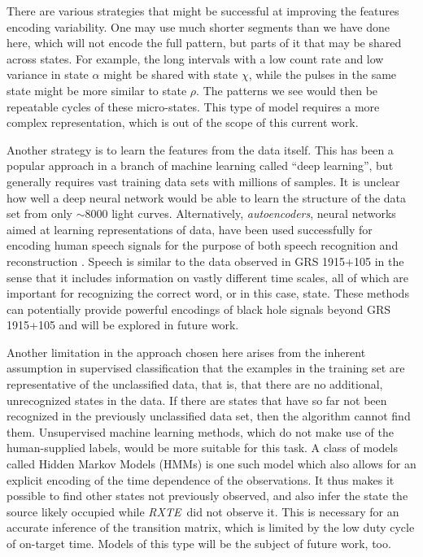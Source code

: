 \documentclass[fleqn,usenatbib]{mnras}
\newcommand{\project}[1]{\textsl{#1}}
\newcommand{\rxte}{\project{RXTE}}
\begin{document}
There are various strategies that might be successful at improving the features encoding variability. One may use much shorter segments than we have done here, 
which will not encode the full pattern, but parts of it that may be shared across states. For example, the long intervals with a low count rate and low variance in state 
$\alpha$ might be shared with state $\chi$, while the pulses in the same state might be more similar to state $\rho$. The patterns we see would then be repeatable 
cycles of these micro-states. This type of model requires a more complex representation, which is out of the scope of this current work. 

Another strategy is to learn the features from the data itself. This has been a popular approach in a branch of machine learning called ``deep learning'', but generally 
requires vast training data sets with millions of samples. It is unclear how well a deep neural network would be able to learn the structure of the data set from only 
$\sim 8000$ light curves. Alternatively, \textit{autoencoders}, neural networks aimed at learning representations of data, have been used successfully for encoding 
human speech signals for the purpose of both speech recognition and reconstruction \citep[for an overview, see e.g.][]{hinton2012}. 
Speech is similar to the data observed in GRS 1915+105 in the sense that it includes information on vastly different time scales, all of which are important for recognizing the correct word, or in this case, state. These methods can potentially provide powerful encodings of black hole signals beyond GRS 1915+105 and will be explored in future work. 

Another limitation in the approach chosen here arises from the inherent assumption in supervised classification that the examples in the training set are representative 
of the unclassified data, that is, that there are no additional, unrecognized states in the data. If there are states that have so far not been 
recognized in the previously unclassified data set, then the algorithm cannot find them. Unsupervised machine learning methods, which do not make 
use of the human-supplied labels, would be more suitable for this task. A class of models called Hidden Markov Models (HMMs) is one such model which also 
allows for an explicit encoding of the time dependence of the observations. It thus makes it possible to find other states not previously observed, and also infer 
the state the source likely occupied while \rxte\ did not observe it. This is necessary for an accurate inference of the transition matrix, which is limited by the 
low duty cycle of on-target time. Models of this type will be the subject of future work, too.
\end{document}

